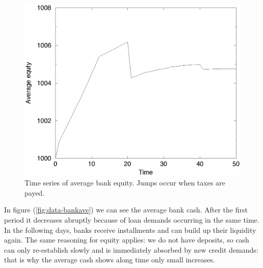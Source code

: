 \begin{figure}[h!]
 \begin{center}
\includegraphics{equity.eps}
  \caption{Time series of average bank equity. Jumps occur when taxes are payed.}
 \label{fig:equity}
  \end{center}
\end{figure}


In figure (\ref{fig:data-bankave}) we can see the average bank cash.
After the first period it decreases abruptly because of loan demands
occurring in the same time. In the following days, banks receive
installments and can build up their liquidity again. The same
reasoning for equity applies: we do not have deposits, so cash can
only re-establish slowly and is immediately absorbed by new credit
demands: that is why the average cash shows along time only small
increases.


